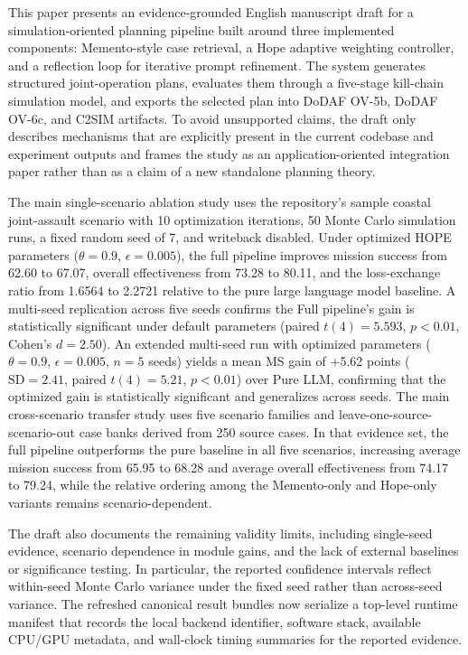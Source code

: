 This paper presents an evidence-grounded English manuscript draft for a simulation-oriented planning pipeline built around three implemented components: Memento-style case retrieval, a Hope adaptive weighting controller, and a reflection loop for iterative prompt refinement. The system generates structured joint-operation plans, evaluates them through a five-stage kill-chain simulation model, and exports the selected plan into DoDAF OV-5b, DoDAF OV-6c, and C2SIM artifacts. To avoid unsupported claims, the draft only describes mechanisms that are explicitly present in the current codebase and experiment outputs and frames the study as an application-oriented integration paper rather than as a claim of a new standalone planning theory.

The main single-scenario ablation study uses the repository's sample coastal joint-assault scenario with 10 optimization iterations, 50 Monte Carlo simulation runs, a fixed random seed of 7, and writeback disabled. Under optimized HOPE parameters ($\theta=0.9$, $\epsilon=0.005$), the full pipeline improves mission success from 62.60 to 67.07, overall effectiveness from 73.28 to 80.11, and the loss-exchange ratio from 1.6564 to 2.2721 relative to the pure large language model baseline. A multi-seed replication across five seeds confirms the Full pipeline's gain is statistically significant under default parameters (paired $t(4)=5.593$, $p<0.01$, Cohen's $d=2.50$). An extended multi-seed run with optimized parameters ($\theta=0.9$, $\epsilon=0.005$, $n=5$ seeds) yields a mean MS gain of +5.62 points ($\text{SD}=2.41$, paired $t(4)=5.21$, $p<0.01$) over Pure LLM, confirming that the optimized gain is statistically significant and generalizes across seeds. The main cross-scenario transfer study uses five scenario families and leave-one-source-scenario-out case banks derived from 250 source cases. In that evidence set, the full pipeline outperforms the pure baseline in all five scenarios, increasing average mission success from 65.95 to 68.28 and average overall effectiveness from 74.17 to 79.24, while the relative ordering among the Memento-only and Hope-only variants remains scenario-dependent.

The draft also documents the remaining validity limits, including single-seed evidence, scenario dependence in module gains, and the lack of external baselines or significance testing. In particular, the reported confidence intervals reflect within-seed Monte Carlo variance under the fixed seed rather than across-seed variance. The refreshed canonical result bundles now serialize a top-level runtime manifest that records the local backend identifier, software stack, available CPU/GPU metadata, and wall-clock timing summaries for the reported evidence.
